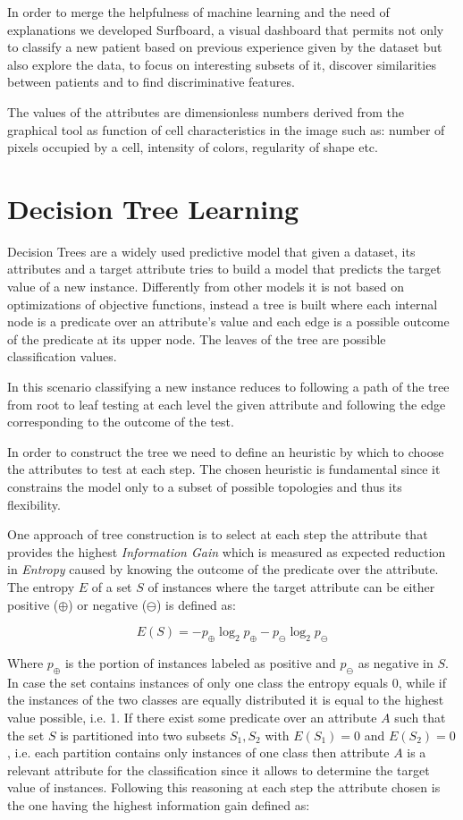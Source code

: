 \documentclass{article}
\begin{document}
In order to merge the helpfulness of machine learning and the need of
explanations we developed Surfboard, a visual dashboard that permits not only to
classify a new patient based on previous experience given by the dataset but
also explore the data, to focus on interesting subsets of it, discover
similarities between patients and to find
discriminative features.

The values of the attributes are dimensionless numbers derived from the
graphical tool as function of cell characteristics in the image such as: number
of pixels occupied by a cell, intensity of colors, regularity of shape etc.


\section{Decision Tree Learning}

Decision Trees are a widely used predictive model that given a dataset, its
attributes and a target attribute tries to build a model that predicts the
target value of a new instance. Differently from other models it is not based on
optimizations of objective functions, instead a tree is built where each
internal node is a predicate over an attribute's value and each edge is a
possible outcome of the predicate at its upper node. The leaves of the tree are
 possible classification values.

In this scenario classifying a new instance reduces to following a path of the
tree from root to leaf testing at each level the given attribute and following
the edge corresponding to the outcome of the test.

In order to construct the tree we need to define an heuristic by which to 
choose the attributes to test at each step.
The chosen heuristic is fundamental since it constrains
the model only to a subset of possible topologies and thus its flexibility.

One approach of tree construction is to select at each step the attribute that
provides the highest \emph{Information Gain} which is measured as expected
reduction in \emph{Entropy} caused by knowing the outcome of the predicate over
the attribute. The entropy $E$ of a set $S$ of instances where the
target attribute can be either positive ($\oplus$) or negative ($\ominus$) is defined as:

\[ E(S) = -p_{\oplus} \log_2 p_{\oplus} -p_{\ominus} \log_2 p_{\ominus} \]

Where $p_{\oplus}$ is the portion of instances labeled as positive and
$p_{\ominus}$ as negative in $S$. In case the set contains instances of only
one class the entropy equals 0, while if the instances of the two classes are
equally distributed it is equal to the highest value possible, i.e. 1. If there
exist some predicate over an attribute $A$ such that the set $S$ is partitioned
into two subsets $S_1, S_2$ with $E(S_1) = 0$ and $E(S_2) = 0$, i.e. each
partition contains only instances of one class then attribute $A$ is a relevant
attribute for the classification since it allows to determine the target value
of instances. Following this reasoning at each step the attribute chosen is the
one having the highest information gain defined as:
\end{document}
